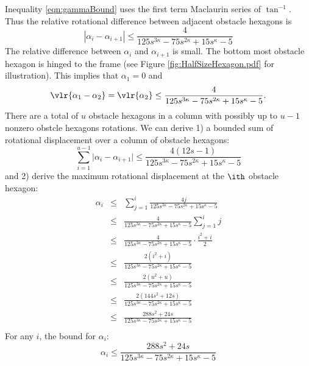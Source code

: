 Inequality \ref{eqn:gammaBound} uses the first term Maclaurin series of $\tan^{-1}$.
Thus the relative rotational difference between adjacent obstacle hexagons is
\begin{equation}\label{eqn:angularBound}
\left\vert \alpha_i - \alpha_{i+1} \right\vert \leq \frac{4}{125 s^{3\kappa}-75 s^{2\kappa}+15 s^\kappa-5}
\end{equation}
The relative difference between $\alpha_i$ and $\alpha_{i+1}$ is small.
The bottom most obstacle hexagon is hinged to the frame (see Figure \ref{fig:HalfSizeHexagon.pdf} for illustration). 
This implies that $\alpha_1 = 0$ and
$$\vlr{\alpha_1 - \alpha_2}=\vlr{\alpha_2}\leq \frac{4}{125 s^{3\kappa}-75 s^{2\kappa}+15 s^\kappa-5}.$$
There are a total of $u$ obstacle hexagons in a column with possibly up to $u-1$ nonzero obstcle hexagons rotations.
We can derive 1) a bounded sum of rotational displacement over a column of obstacle hexagons:
\begin{equation}\label{eqn:angularSumBound}
\sum_{i=1}^{u-1} \vert \alpha_i - \alpha_{i+1} \vert \leq \frac{4(12s-1)}{125 s^{3\kappa}-75 s^{2\kappa}+15 s^\kappa-5}
\end{equation}
and 2) derive the maximum rotational displacement at the $\ith$ obstacle hexagon:
\begin{eqnarray*}
\alpha_i &\leq& \sum_{j=1}^i \frac{4j}{125 s^{3\kappa}-75 s^{2\kappa}+15 s^\kappa-5}\\
&\leq&\frac{4}{125 s^{3\kappa}-75 s^{2\kappa}+15 s^\kappa-5}\sum_{j=1}^i j\\
&\leq&\frac{4}{125 s^{3\kappa}-75 s^{2\kappa}+15 s^\kappa-5} \cdot \frac{i^2+i}{2}\\
&\leq&\frac{2(i^2+i)}{125 s^{3\kappa}-75 s^{2\kappa}+15 s^\kappa-5}\\
&\leq&\frac{2(u^2+u)}{125 s^{3\kappa}-75 s^{2\kappa}+15 s^\kappa-5}\\
&\leq&\frac{2(144s^2+12s)}{125 s^{3\kappa}-75 s^{2\kappa}+15 s^\kappa-5}\\
&\leq&\frac{288s^2+24s}{125 s^{3\kappa}-75 s^{2\kappa}+15 s^\kappa-5}\\
\end{eqnarray*}
For any $i$, the bound for $\alpha_i$:
\begin{equation}\label{eqn:angularMaxBound}
\alpha_i \leq \frac{288s^2+24s}{125 s^{3\kappa}-75 s^{2\kappa}+15 s^\kappa-5}
\end{equation}
